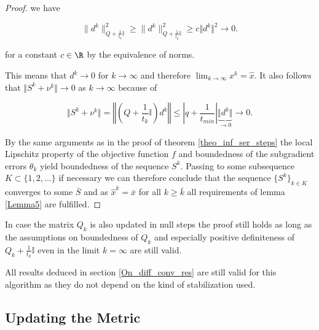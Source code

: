 \begin{proof}
we have 

\begin{equation*}
	  \lVert d^k\rVert^2_{Q+\frac{1}{t_k}\mathbb{I}} \geq  \lVert d^k\rVert^2_{Q+\frac{1}{t_{\bar{k}}}\mathbb{I}} \geq c\Vert d^k\Vert^2 \to 0.
\end{equation*}

for a constant \(c \in \R \) by the equivalence of norms.

This means that \(d^k \to 0\) for \(k \to \infty\) and therefore \(\lim_{k \to \infty}x^k = \hat{x}\). It also follows that \(\Vert S^k+\nu^k\Vert \to 0\) as \(k \to \infty\) because of 

\[ \Vert S^{{k}} + \nu^{{k}} \Vert = \left\Vert\left(Q+\frac{1}{t_{{k}}}\mathbb{I}\right)d^{{k}} \right\Vert \leq \left \vert q + \frac{1}{t_{min}}\right\vert \underbrace{\Vert d^{k}\Vert}_{\to 0} \to 0.\]

By the same arguments as in the proof of theorem \ref{theo_inf_ser_steps} the local Lipschitz property of the objective function \(f\) and boundedness of the subgradient errors \(\theta_k\) yield boundedness of the sequence \(S^k\). Passing to some subsequence \(K \subset \{1,2,...\}\) if necessary we can therefore conclude that the sequence \(\{S^k\}_{k\in K}\) converges to some \(\bar{S}\) and as \(\hat{x}^k = \bar{x}\) for all \(k \geq \bar{k}\) all requirements of lemma \ref{Lemma5} are fulfilled.

\end{proof}

\begin{remark}
	In case the matrix \(Q_k\) is also updated in null steps the proof still holds as long as the assumptions on boundedness of \(Q_k\) and especially  positive definiteness of \(Q_k+\frac{1}{t_k}\mathbb{I}\) even in the limit \(k = \infty\) are still valid.
\end{remark}

\begin{remark}
	All results deduced in section \ref{On_diff_conv_res} are still valid for this algorithm as they do not depend on the kind of stabilization used.
\end{remark}

\subsection{Updating the Metric}
\label{sec_upd_Q}


